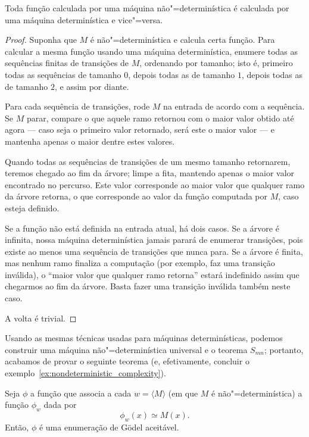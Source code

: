 \begin{theorem}
    Toda função calculada por uma máquina não"=determinística
    é calculada por uma máquina determinística
    e vice"=versa.
\end{theorem}
\begin{proof}
    Suponha que $M$ é não"=determinística e calcula certa função.
    Para calcular a mesma função usando uma máquina determinística,
    enumere todas as sequências finitas de transições de $M$,
    ordenando por tamanho;
    isto é,
    primeiro todas as sequências de tamanho $0$,
    depois todas as de tamanho $1$,
    depois todas as de tamanho $2$,
    e assim por diante.

    Para cada sequência de transições,
    rode $M$ na entrada de acordo com a sequência.
    Se $M$ parar,
    compare o que aquele ramo retornou
    com o maior valor obtido até agora
    --- caso seja o primeiro valor retornado,
    será este o maior valor
    --- e mantenha apenas o maior dentre estes valores.

    Quando todas as sequências de transições de um mesmo tamanho retornarem,
    teremos chegado ao fim da árvore;
    limpe a fita, mantendo apenas o maior valor encontrado no percurso.
    Este valor corresponde ao maior valor que qualquer ramo da árvore retorna,
    o que corresponde ao valor da função computada por $M$,
    caso esteja definido.

    Se a função não está definida na entrada atual,
    há dois casos.
    Se a árvore é infinita,
    nossa máquina determinística jamais parará de enumerar transições,
    pois existe ao menos uma sequência de transições que nunca para.
    Se a árvore é finita,
    mas nenhum ramo finaliza a computação
    (por exemplo, faz uma transição inválida),
    o ``maior valor que qualquer ramo retorna''
    estará indefinido assim que chegarmos ao fim da árvore.
    Basta fazer uma transição inválida também neste caso.

    A volta é trivial.
\end{proof}

Usando as mesmas técnicas usadas para máquinas determinísticas,
podemos construir uma máquina não"=determinística universal
e o teorema $S_{mn}$;
portanto, acabamos de provar o seguinte teorema
(e, efetivamente,
concluir o exemplo~\ref{ex:nondeterministic_complexity}).

\begin{ucorollary}
    Seja $\phi$ a função que associa a cada $w = \langle M \rangle$
    (em que $M$ é não"=determinística)
    a função $\phi_w$ dada por
    \begin{equation*}
        \phi_w(x) \simeq M(x).
    \end{equation*}
    Então, $\phi$ é uma enumeração de Gödel aceitável.
\end{ucorollary}
